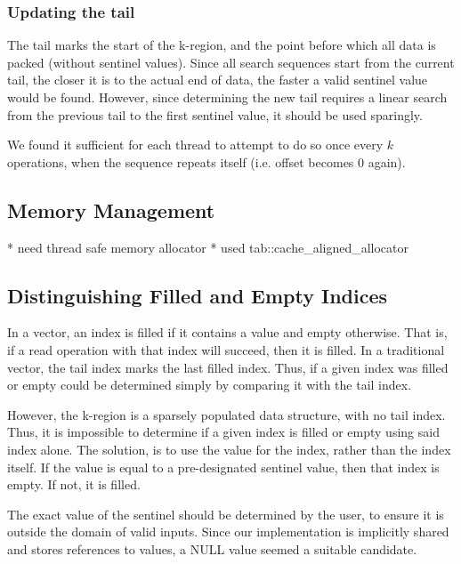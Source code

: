 \documentclass{sigplanconf}
\begin{document}
\subsubsection{Updating the tail}

The tail marks the start of the k-region, and the point before which
all data is packed (without sentinel values). Since all search sequences
start from the current tail, the closer it is to the actual end of
data, the faster a valid sentinel value would be found. However, since
determining the new tail requires a linear search from the previous
tail to the first sentinel value, it should be used sparingly.

We found it sufficient for each thread to attempt to do so once every
$k$ operations, when the sequence repeats itself (i.e. offset becomes
0 again).

\subsection{Memory Management}
* need thread safe memory allocator
* used tab::cache\_aligned\_allocator

\subsection{Distinguishing Filled and Empty Indices}

In a vector, an index is filled if it contains a value and empty otherwise. That is, if a read operation with that index will succeed, then it is filled. In a traditional vector, the tail index marks the last filled index. Thus, if a given index was filled or empty could be determined simply by comparing it with the tail index.

However, the k-region is a sparsely populated data structure, with no tail index. Thus, it is impossible to determine if a given index is filled or empty using said index alone. The solution, is to use the value for the index, rather than the index itself. If the value is equal to a pre-designated sentinel value, then that index is empty. If not, it is filled.

The exact value of the sentinel should be determined by the user, to ensure it is outside the domain of valid inputs. Since our implementation is implicitly shared and stores references to values, a NULL value seemed a suitable candidate.
\end{document}
